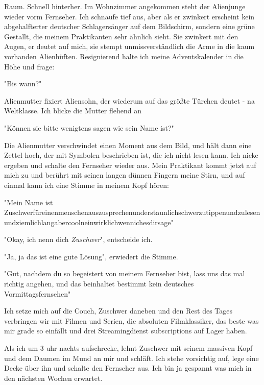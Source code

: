 \documentclass[11pt]{article}
\begin{document}
Raum. Schnell hinterher. Im Wohnzimmer angekommen steht der Alienjunge
wieder vorm Fernseher. Ich schnaufe tief aus, aber als er zwinkert
erscheint kein abgehalfterter deutscher Schlagersänger auf dem
Bildschirm, sondern eine grüne Gestallt, die meinem Praktikanten sehr
ähnlich sieht. Sie zwinkert mit den Augen, er deutet auf mich, sie
stempt unmissverständlich die Arme in die kaum vorhanden Alienhüften.
Resignierend halte ich meine Adventskalender in die Höhe und frage:
\begin{center}
"Bis wann?"
\end{center}
Alienmutter fixiert Aliensohn, der wiederum auf das größte Türchen
deutet - na Weltklasse. Ich blicke die Mutter flehend an
\begin{center}
"Können sie bitte wenigtens sagen wie sein Name ist?"
\end{center}
Die Alienmutter verschwindet einen Moment aus dem Bild, und hält dann
eine Zettel hoch, der mit Symbolen beschrieben ist, die ich nicht
lesen kann. Ich nicke ergeben und schalte den Fernseher wieder aus. 
Mein Praktikant kommt jetzt auf mich zu und berührt mit seinen langen
dünnen Fingern meine Stirn, und auf einmal kann ich eine Stimme in
meinem Kopf hören:
\begin{center}
"Mein Name ist Zuschwerfüreinenmenschenauszusprechenunderstaunlichschwerzutippenundzulesenundziemlichlangabercoolneinwirklichwennichesdirsage"
\end{center}
\begin{center}
"Okay, ich nenn dich \emph{Zuschwer}", entscheide ich.
\end{center}
\begin{center}
"Ja, ja das ist eine gute Lösung", erwiedert die Stimme. 
\end{center}
\begin{center}
"Gut, nachdem du so begeistert von meinem Fernseher bist, lass uns das
mal richtig angehen, und das beinhaltet bestimmt kein deutsches Vormittagsfernsehen"
\end{center}
Ich setze mich auf die Couch, Zuschwer daneben und den Rest des Tages
verbringen wir mit Filmen und Serien, die absoluten Filmklassiker, das
beste was mir grade so einfällt und drei Streamingdienst subscriptions
auf Lager haben.

\noindent Als ich um 3 uhr nachts aufschrecke, lehnt Zuschwer mit  seinem massiven
Kopf und dem Daumen im Mund an mir und schläft. Ich stehe vorsichtig
auf, lege eine Decke über ihn und schalte den Fernseher aus. Ich bin
ja gespannt was mich in den nächsten Wochen erwartet.
\newpage
\end{document}
